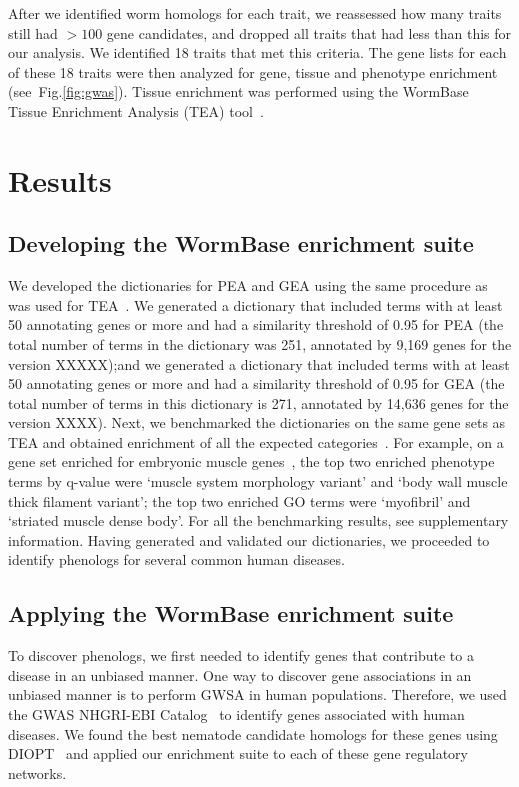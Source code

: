 \documentclass[10pt,letterpaper,twocolumn]{article}
\begin{document}
After we identified worm homologs for each trait, we reassessed how many traits
still had $>100$ gene candidates, and dropped all traits that had less than this
for our analysis. We identified 18 traits that met this criteria. The gene
lists for each of these 18 traits were then analyzed for gene, tissue and
phenotype enrichment (see~Fig.\ref{fig:gwas}). Tissue enrichment was
performed using the WormBase Tissue Enrichment Analysis (TEA)
tool~\cite{Angeles-Albores2016}.


\section*{Results}
\subsection*{Developing the WormBase enrichment suite}
We developed the dictionaries for PEA and GEA using the same procedure as was
used for TEA~\cite{Angeles-Albores2016}. We generated a dictionary that
included terms with at
least 50 annotating genes or more and had a similarity threshold of 0.95 for PEA
(the total number of terms in the dictionary was 251, annotated by 9,169 genes
 for the version XXXXX);\@ and we generated a
dictionary that included terms with at least 50 annotating genes or more and
had a similarity threshold of 0.95 for GEA (the total number of terms in this
dictionary is 271, annotated by 14,636 genes for the version XXXX).
\@ Next, we benchmarked the dictionaries on the same gene
sets as TEA and obtained enrichment of all the expected
categories~\cite{Gaudet2004a, Spencer2011, Cinar2005, Watson2008a,
Pauli2006, Portman2004, Fox2007, Smith2010}.
For example,
on a gene set enriched for embryonic muscle genes~\cite{Watson2008a},
the top two enriched
phenotype terms by q-value were `muscle system morphology variant' and `body
wall muscle thick filament variant'; the top two enriched GO terms were
`myofibril' and `striated muscle dense body'. For all the benchmarking
results, see supplementary information. Having generated and validated our
dictionaries, we proceeded to identify phenologs for several common human
diseases.

\subsection*{Applying the WormBase enrichment suite}
To discover phenologs, we first needed to identify genes that
contribute to a disease in an unbiased manner. One way to discover gene
associations in an unbiased manner is to perform GWSA in human populations.
Therefore, we used the GWAS NHGRI-EBI
Catalog~\cite{MacArthur2016} to identify genes associated with human diseases. We found the
best nematode candidate homologs for these genes using DIOPT~\cite{Hu2011} and applied
our enrichment suite to each of these gene regulatory networks.
\end{document}
